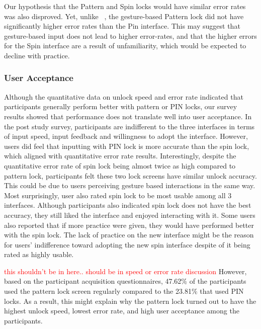 \documentclass{sigchi}
\newcommand{\comment}[1]{\textcolor{red}{#1}}
\begin{document}
Our hypothesis that the Pattern and Spin locks would have similar error rates was also disproved. Yet, unlike ~\cite{von_zezschwitz_patterns_2013}, the gesture-based Pattern lock did not have significantly higher error rates than the Pin interface. This may suggest that gesture-based input does not lead to higher error-rates, and that the higher errors for the Spin interface are a result of unfamiliarity, which would be expected to decline with practice. 


\subsubsection{User Acceptance}


Although the quantitative data on unlock speed and error rate indicated that participants generally perform better with pattern or PIN locks, our survey results showed that performance does not translate well into user acceptance. In the post study survey, participants are indifferent to the three interfaces in terms of input speed, input feedback and willingness to adopt the interface. However, users did feel that inputting with PIN lock is more accurate than the spin lock, which aligned with quantitative error rate results. Interestingly, despite the quantitative error rate of spin lock being almost twice as high compared to pattern lock, participants felt these two lock screens have similar unlock accuracy. This could be due to users perceiving gesture based interactions in the same way. Most surprisingly, user also rated spin lock to be most usable among all 3 interfaces. Although participants also indicated spin lock does not have the best accuracy, they still liked the interface and enjoyed interacting with it. Some users also reported that if more practice were given, they would have performed better with the spin lock. The lack of practice on the new interface might be the reason for users' indifference toward adopting the new spin interface despite of it being rated as highly usable. 

\comment{this shouldn't be in here.. should be in speed or error rate discussion}
However, based on the participant acquisition questionnaires, 47.62\% of the participants used the pattern lock screen regularly compared to the 23.81\% that used PIN locks. As a result, this might explain why the pattern lock turned out to have the highest unlock speed, lowest error rate, and high user acceptance among the participants. 
\end{document}
